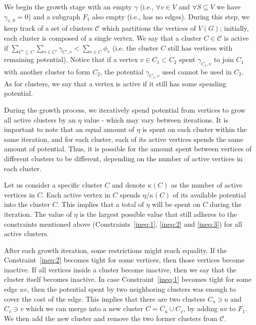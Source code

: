 We begin the growth stage with an empty \(\gamma\) (i.e., \(\forall v \in V\) and \(\forall S \subseteq V\) we have \(\gamma_{v, S} = 0\)) and a subgraph \(F_1\) also empty (i.e., has no edges). During this step, we keep track of a set of clusters \(\mathcal{C}\) which partitions the vertices of \(V(G)\); initially, each cluster is composed of a single vertex. We say that a cluster \(C \in \mathcal{C}\) is active if  \(\sum_{C' \subseteq C} \sum_{v \in C'} \gamma_{C', v} < \sum_{v \in C} \phi_v\) (i.e. the cluster \(C\) still has vertices with remaining potential). Notice that if a vertex \(v \in C_1 \subset C_2\) spent \(\gamma_{C_1, v}\) to join \(C_1\) with another cluster to form \(C_2\), the potential \(\gamma_{C_1, v}\) used cannot be used in \(C_2\).
As for clusters, we say that a vertex is active if it still has some spending potential.

During the growth process, we iteratively spend potential from vertices to grow all active clusters by an \(\eta\) value - which may vary between iterations. It is important to note that an equal amount of \(\eta\) is spent on each cluster within the same iteration, and for each cluster, each of its active vertices spends the same amount of potential. Thus, it is possible for the amount spent between vertices of different clusters to be different, depending on the number of active vertices in each cluster.

Let us consider a specific cluster \(C\) and denote \(\kappa(C)\) as the number of active vertices in \(C\). Each active vertex in \(C\) spends \(\eta / \kappa(C)\) of its available potential into the cluster \(C\). This implies that a total of \(\eta\) will be spent on \(C\) during the iteration.
The value of \(\eta\) is the largest possible value that still adheres to the constraints mentioned above (Constraints~\eqref{ineq:1}, \eqref{ineq:2} and \eqref{ineq:3}) for all active clusters.

After each growth iteration, some restrictions might reach equality. If the Constraint~\eqref{ineq:2} becomes tight for some vertices, then those vertices become inactive. 
If all vertices inside a cluster become inactive, then we say that the cluster itself becomes inactive. 
In case Constraint~\eqref{ineq:1} becomes tight for some edge \(uv\), then the potential spent by two neighboring clusters was enough to cover the cost of the edge. This implies that there are two clusters \(C_u \ni u\) and \(C_v \ni v\) which we can merge into a new cluster \(C = C_u \cup C_v\), by adding \(uv\) to \(F_1\). We then add the new cluster and remove the two former clusters from \(\mathcal{C}\).

